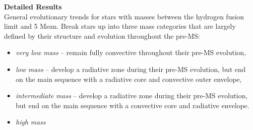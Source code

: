 \textbf{Detailed Results} \\
General evolutionary trends for stars with masses between the hydrogen fusion limit and 5 Msun. Break stars up into three mass categories that are largely defined by their structure and evolution throughout the pre-MS: 
\begin{itemize}
 \item[] {\it very low mass} -- remain fully convective throughout their pre-MS evolution,
 \item[] {\it low mass} -- develop a radiative zone during their pre-MS evolution, but end on the main sequence with a radiative core and convective outer envelope,
 \item[] {\it intermediate mass} -- develop a radiative zone during their pre-MS evolution, but end on the main sequence with a convective core and radiative envelope.
 \item[] {\it high mass} 
\end{itemize}